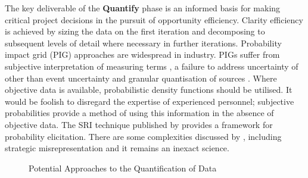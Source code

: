 The key deliverable of the \textbf{Quantify} phase is an informed basis for making critical project decisions in the pursuit of opportunity efficiency.
Clarity efficiency is achieved by sizing the data on the first iteration and decomposing to subsequent levels of detail where necessary in further iterations.
Probability impact grid (PIG) approaches are widespread in industry.
PIGs suffer from subjective interpretation of measuring terms \citep{Merkhofer}, a failure to address uncertainty of other than event uncertainty and granular quantisation of sources \citep{Cox2008}.
Where objective data is available, probabilistic density functions should be utilised.
It would be foolish to disregard the expertise of experienced personnel; subjective probabilities provide a method of using this information in the absence of objective data.
The SRI technique published by \citet{spetzer} provides a framework for probability elicitation.
There are some complexities discussed by \citet{Merkhofer}, including strategic misrepresentation \citep{flyvbjerg} and it remains an inexact science.


\begin{figure}[!h]
  \centering
{} \quad
{}
\caption{Potential Approaches to the Quantification of Data}
\label{Figure:DefineFocus}
\end{figure}


